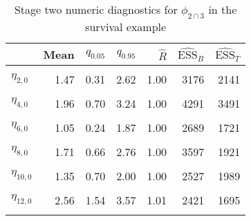 \begin{table}

\caption{\label{tab:surv-stage-two-diag-phi-23}Stage two numeric diagnostics for $\phi_{2 \cap 3}$ in the survival example}
\centering
\begin{tabular}[t]{lrrrrrr}
\toprule
  & Mean & $q_{0.05}$ & $q_{0.95}$ & $\widehat{R}$ & $\widehat{\text{ESS}}_{B}$ & $\widehat{\text{ESS}}_{T}$\\
\midrule
\cellcolor{gray!6}{$\eta_{1, 0}$} & \cellcolor{gray!6}{0.60} & \cellcolor{gray!6}{-0.27} & \cellcolor{gray!6}{1.45} & \cellcolor{gray!6}{1.00} & \cellcolor{gray!6}{2450} & \cellcolor{gray!6}{2011}\\
$\eta_{2, 0}$ & 1.47 & 0.31 & 2.62 & 1.00 & 3176 & 2141\\
\cellcolor{gray!6}{$\eta_{3, 0}$} & \cellcolor{gray!6}{3.22} & \cellcolor{gray!6}{2.24} & \cellcolor{gray!6}{4.20} & \cellcolor{gray!6}{1.00} & \cellcolor{gray!6}{3620} & \cellcolor{gray!6}{2705}\\
$\eta_{4, 0}$ & 1.96 & 0.70 & 3.24 & 1.00 & 4291 & 3491\\
\cellcolor{gray!6}{$\eta_{5, 0}$} & \cellcolor{gray!6}{1.24} & \cellcolor{gray!6}{0.17} & \cellcolor{gray!6}{2.31} & \cellcolor{gray!6}{1.00} & \cellcolor{gray!6}{3250} & \cellcolor{gray!6}{1607}\\
$\eta_{6, 0}$ & 1.05 & 0.24 & 1.87 & 1.00 & 2689 & 1721\\
\cellcolor{gray!6}{$\eta_{7, 0}$} & \cellcolor{gray!6}{3.95} & \cellcolor{gray!6}{2.56} & \cellcolor{gray!6}{5.38} & \cellcolor{gray!6}{1.00} & \cellcolor{gray!6}{4203} & \cellcolor{gray!6}{3835}\\
$\eta_{8, 0}$ & 1.71 & 0.66 & 2.76 & 1.00 & 3597 & 1921\\
\cellcolor{gray!6}{$\eta_{9, 0}$} & \cellcolor{gray!6}{1.13} & \cellcolor{gray!6}{0.16} & \cellcolor{gray!6}{2.03} & \cellcolor{gray!6}{1.00} & \cellcolor{gray!6}{3058} & \cellcolor{gray!6}{1257}\\
$\eta_{10, 0}$ & 1.35 & 0.70 & 2.00 & 1.00 & 2527 & 1989\\
\cellcolor{gray!6}{$\eta_{11, 0}$} & \cellcolor{gray!6}{2.20} & \cellcolor{gray!6}{1.40} & \cellcolor{gray!6}{3.00} & \cellcolor{gray!6}{1.00} & \cellcolor{gray!6}{2377} & \cellcolor{gray!6}{2413}\\
$\eta_{12, 0}$ & 2.56 & 1.54 & 3.57 & 1.01 & 2421 & 1695\\
\cellcolor{gray!6}{$\eta_{13, 0}$} & \cellcolor{gray!6}{2.17} & \cellcolor{gray!6}{1.24} & \cellcolor{gray!6}{3.06} & \cellcolor{gray!6}{1.00} & \cellcolor{gray!6}{3294} & \cellcolor{gray!6}{1377}\\

\end{tabular}
\end{table}
